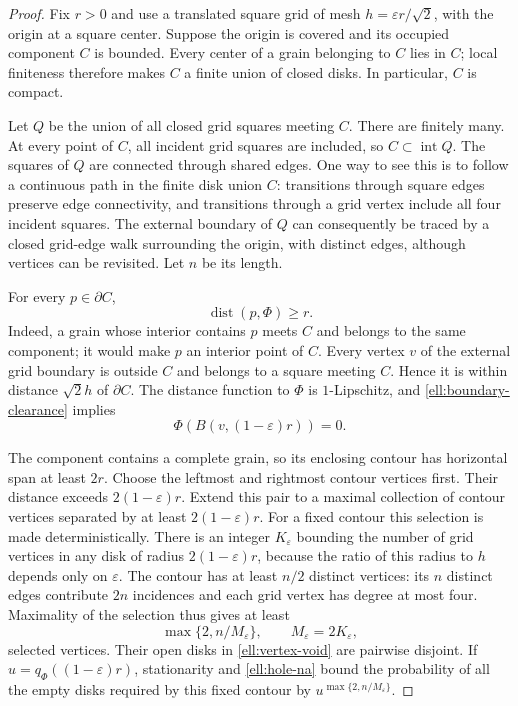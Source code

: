 \documentclass[11pt,a4paper]{article}
\theoremstyle{definition}
\theoremstyle{remark}
\numberwithin{equation}{section}
\begin{document}
\begin{proof}
Fix $r>0$ and use a translated square grid of mesh
$h=\varepsilon r/\sqrt2$, with the origin at a square center.
Suppose the origin is covered and its occupied component $C$ is
bounded.  Every center of a grain belonging to $C$ lies in $C$;
local finiteness therefore makes $C$ a finite union of closed disks.
In particular, $C$ is compact.

Let $Q$ be the union of all closed grid squares meeting $C$.
There are finitely many.  At every point of $C$, all incident grid
squares are included, so $C\subset\operatorname{int}Q$.
The squares of $Q$ are connected through shared edges.  One way to
see this is to follow a continuous path in the finite disk union
$C$: transitions through square edges preserve edge connectivity,
and transitions through a grid vertex include all four incident
squares.  The external boundary of $Q$ can consequently be traced
by a closed grid-edge walk surrounding the origin, with distinct
edges, although vertices can be revisited.  Let $n$ be its length.

For every $p\in\partial C$,
\begin{equation}\label{ell:boundary-clearance}
 \operatorname{dist}(p,\Phi)\ge r.
\end{equation}
Indeed, a grain whose interior contains $p$ meets $C$ and belongs
to the same component; it would make $p$ an interior point of $C$.
Every vertex $v$ of the external grid boundary is outside $C$ and
belongs to a square meeting $C$.  Hence it is within distance
$\sqrt2h$ of $\partial C$.  The distance function to $\Phi$ is
$1$-Lipschitz, and \eqref{ell:boundary-clearance} implies
\begin{equation}\label{ell:vertex-void}
 \Phi(B(v,(1-\varepsilon)r))=0.
\end{equation}

The component contains a complete grain, so its enclosing contour
has horizontal span at least $2r$.  Choose the leftmost and rightmost
contour vertices first.  Their distance exceeds
$2(1-\varepsilon)r$.  Extend this pair to a maximal collection of
contour vertices separated by at least $2(1-\varepsilon)r$.
For a fixed contour this selection is made deterministically.
There is an integer $K_\varepsilon$ bounding the number of grid
vertices in any disk of radius $2(1-\varepsilon)r$, because the
ratio of this radius to $h$ depends only on $\varepsilon$.
The contour has at least $n/2$ distinct vertices: its $n$ distinct
edges contribute $2n$ incidences and each grid vertex has degree
at most four.  Maximality of the selection thus gives at least
\[
 \max\{2,n/M_\varepsilon\},\qquad M_\varepsilon=2K_\varepsilon,
\]
selected vertices.  Their open disks in \eqref{ell:vertex-void}
are pairwise disjoint.  If $u=q_\Phi((1-\varepsilon)r)$,
stationarity and \eqref{ell:hole-na} bound the probability of all
the empty disks required by this fixed contour by
$u^{\max\{2,n/M_\varepsilon\}}$.


\end{proof}
\end{document}
